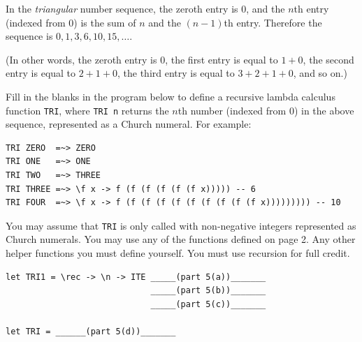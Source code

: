\documentclass[addpoints]{exam}
\begin{document}
\begin{questions}
\begin{parts}
\end{parts}

\newpage

\question In the \emph{triangular} number sequence, the zeroth entry is $0$, and the $n$th entry (indexed from 0) is the sum of $n$ and the $(n - 1)$th entry.  Therefore the sequence is $0, 1, 3, 6, 10, 15, \dots$.

(In other words, the zeroth entry is $0$, the first entry is equal to $1 + 0$, the second entry is equal to $2 + 1 + 0$, the third entry is equal to $3 + 2 + 1 + 0$, and so on.)

Fill in the blanks in the program below to define a recursive lambda calculus function \texttt{TRI}, where \texttt{TRI n} returns the $n$th number (indexed from 0) in the above sequence, represented as a Church numeral.  For example:

\begin{verbatim}
TRI ZERO  =~> ZERO
TRI ONE   =~> ONE
TRI TWO   =~> THREE
TRI THREE =~> \f x -> f (f (f (f (f (f x))))) -- 6
TRI FOUR  =~> \f x -> f (f (f (f (f (f (f (f (f (f x))))))))) -- 10
\end{verbatim}

You may assume that \texttt{TRI} is only called with non-negative integers represented as Church numerals.  You may use any of the functions defined on page 2.  Any other helper functions you must define yourself.  You must use recursion for full credit.

\begin{verbatim}
let TRI1 = \rec -> \n -> ITE _____(part 5(a))_______
                             _____(part 5(b))_______
                             _____(part 5(c))_______
                      
let TRI = ______(part 5(d))_______
\end{verbatim}

\end{questions}
\end{document}
